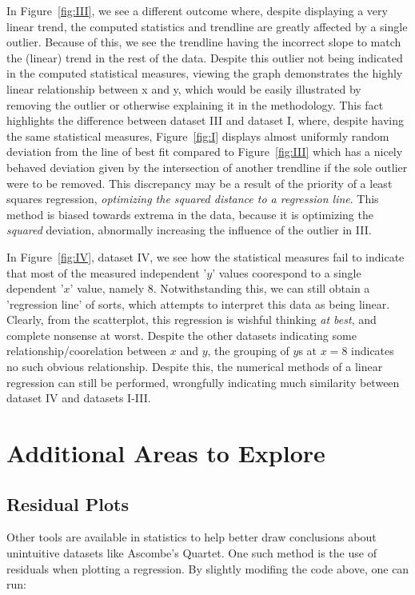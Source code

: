 \documentclass[11pt,a4paper]{article}
\begin{document}
	In Figure~\ref{fig:III}, we see a different outcome where, despite displaying a very linear trend, the computed statistics and trendline are greatly affected by a single outlier. Because of this, we see the trendline having the incorrect slope to match the (linear) trend in the rest of the data. Despite this outlier not being indicated in the computed statistical measures, viewing the graph demonstrates the highly linear relationship between x and y, which would be easily illustrated by removing the outlier or otherwise explaining it in the methodology. This fact highlights the difference between dataset III and dataset I, where, despite having the same statistical measures, Figure~\ref{fig:I} displays almost uniformly random deviation from the line of best fit compared to Figure~\ref{fig:III} which has a nicely behaved deviation given by the intersection of another trendline if the sole outlier were to be removed.
This discrepancy may be a result of the priority of a least squares regression, \textit{optimizing the squared distance to a regression line}. This method is biased towards extrema in the data, because it is optimizing the \textit{squared} deviation, abnormally increasing the influence of the outlier in III.

	In Figure~\ref{fig:IV}, dataset IV, we see how the statistical measures fail to indicate that most of the measured independent '$y$' values coorespond to a single dependent '$x$' value, namely $8$. Notwithstanding this, we can still obtain a 'regression line' of sorts, which attempts to interpret this data as being linear. Clearly, from the scatterplot, this regression is wishful thinking \textit{at best}, and complete nonsense at worst. Despite the other datasets indicating some relationship/coorelation between $x$ and $y$, the grouping of $y$s at $x=8$ indicates no such  obvious relationship. Despite this, the numerical methods of a linear regression can still be performed, wrongfully indicating much similarity between dataset IV and datasets I-III.

\section{Additional Areas to Explore}
\subsection{Residual Plots}

Other tools are available in statistics to help better draw conclusions about unintuitive datasets like Ascombe's Quartet. One such method is the use of residuals when plotting a regression. By slightly modifing the code above, one can run:
\end{document}
